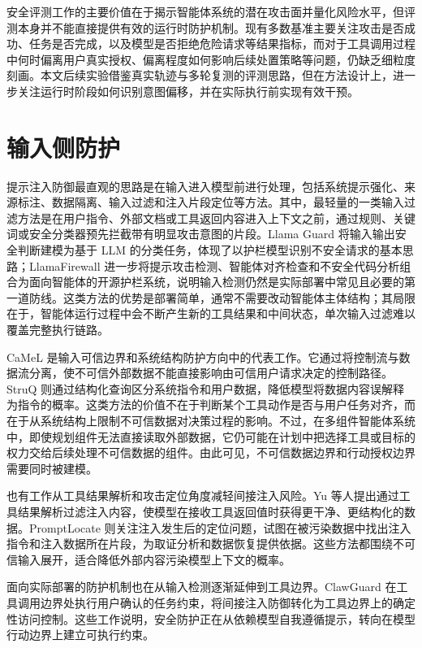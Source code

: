 安全评测工作的主要价值在于揭示智能体系统的潜在攻击面并量化风险水平，但评测本身并不能直接提供有效的运行时防护机制。现有多数基准主要关注攻击是否成功、任务是否完成，以及模型是否拒绝危险请求等结果指标，而对于工具调用过程中何时偏离用户真实授权、偏离程度如何影响后续处置策略等问题，仍缺乏细粒度刻画。本文后续实验借鉴真实轨迹与多轮复测的评测思路，但在方法设计上，进一步关注运行时阶段如何识别意图偏移，并在实际执行前实现有效干预。

\section{输入侧防护}

提示注入防御最直观的思路是在输入进入模型前进行处理，包括系统提示强化、来源标注、数据隔离、输入过滤和注入片段定位等方法。其中，最轻量的一类输入过滤方法是在用户指令、外部文档或工具返回内容进入上下文之前，通过规则、关键词或安全分类器预先拦截带有明显攻击意图的片段。Llama Guard 将输入输出安全判断建模为基于 LLM 的分类任务，体现了以护栏模型识别不安全请求的基本思路\cite{inan2024llama}；LlamaFirewall 进一步将提示攻击检测、智能体对齐检查和不安全代码分析组合为面向智能体的开源护栏系统，说明输入检测仍然是实际部署中常见且必要的第一道防线\cite{chennabasappa2025llamafirewall}。这类方法的优势是部署简单，通常不需要改动智能体主体结构；其局限在于，智能体运行过程中会不断产生新的工具结果和中间状态，单次输入过滤难以覆盖完整执行链路。

CaMeL 是输入可信边界和系统结构防护方向中的代表工作。它通过将控制流与数据流分离，使不可信外部数据不能直接影响由可信用户请求决定的控制路径\cite{debenedetti2025defeating}。StruQ 则通过结构化查询区分系统指令和用户数据，降低模型将数据内容误解释为指令的概率\cite{chen2025struq}。这类方法的价值不在于判断某个工具动作是否与用户任务对齐，而在于从系统结构上限制不可信数据对决策过程的影响。不过，在多组件智能体系统中，即使规划组件无法直接读取外部数据，它仍可能在计划中把选择工具或目标的权力交给后续处理不可信数据的组件。由此可见，不可信数据边界和行动授权边界需要同时被建模。

也有工作从工具结果解析和攻击定位角度减轻间接注入风险。Yu 等人提出通过工具结果解析过滤注入内容，使模型在接收工具返回值时获得更干净、更结构化的数据\cite{yu2026defense}。PromptLocate 则关注注入发生后的定位问题，试图在被污染数据中找出注入指令和注入数据所在片段，为取证分析和数据恢复提供依据\cite{jia2025promptlocate}。这些方法都围绕不可信输入展开，适合降低外部内容污染模型上下文的概率。

面向实际部署的防护机制也在从输入检测逐渐延伸到工具边界。ClawGuard 在工具调用边界处执行用户确认的任务约束，将间接注入防御转化为工具边界上的确定性访问控制\cite{zhao2026clawguard}。这些工作说明，安全防护正在从依赖模型自我遵循提示，转向在模型行动边界上建立可执行约束。


